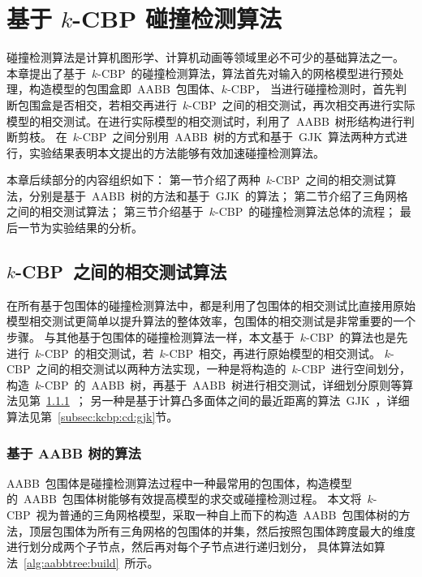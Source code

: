 

\chapter{基于 $k$-CBP 碰撞检测算法}
\label{cha:kcbp-collision-detection}

碰撞检测算法是计算机图形学、计算机动画等领域里必不可少的基础算法之一。
本章提出了基于~$k$-CBP~的碰撞检测算法，算法首先对输入的网格模型进行预处理，构造模型的包围盒即~AABB~包围体、$k$-CBP，
当进行碰撞检测时，首先判断包围盒是否相交，若相交再进行~$k$-CBP~之间的相交测试，再次相交再进行实际模型的相交测试。在进行实际模型的相交测试时，利用了~AABB~树形结构进行判断剪枝。
在~$k$-CBP~之间分别用~AABB~树的方式和基于~GJK~算法两种方式进行，实验结果表明本文提出的方法能够有效加速碰撞检测算法。

本章后续部分的内容组织如下：
第一节介绍了两种~$k$-CBP~之间的相交测试算法，分别是基于~AABB~树的方法和基于~GJK~的算法；
第二节介绍了三角网格之间的相交测试算法；
第三节介绍基于~$k$-CBP~的碰撞检测算法总体的流程；
最后一节为实验结果的分析。

\section{$k$-CBP~之间的相交测试算法}
\label{sec:kcbp:cd}

在所有基于包围体的碰撞检测算法中，都是利用了包围体的相交测试比直接用原始模型相交测试更简单以提升算法的整体效率，包围体的相交测试是非常重要的一个步骤。
与其他基于包围体的碰撞检测算法一样，本文基于~$k$-CBP~的算法也是先进行~$k$-CBP~的相交测试，若~$k$-CBP~相交，再进行原始模型的相交测试。
$k$-CBP~之间的相交测试以两种方法实现，一种是将构造的~$k$-CBP~进行空间划分，构造~$k$-CBP~的~AABB~树，再基于~AABB~树进行相交测试，详细划分原则等算法见第~\ref{subsec:kcbp:cd:aabb}~；
另一种是基于计算凸多面体之间的最近距离的算法~GJK~，详细算法见第~\ref{subsec:kcbp:cd:gjk}节。

\subsection{基于 AABB 树的算法}
\label{subsec:kcbp:cd:aabb}

AABB~包围体是碰撞检测算法过程中一种最常用的包围体，构造模型的~AABB~包围体树能够有效提高模型的求交或碰撞检测过程。
本文将~$k$-CBP~视为普通的三角网格模型，采取一种自上而下的构造~AABB~包围体树的方法，顶层包围体为所有三角网格的包围体的并集，然后按照包围体跨度最大的维度进行划分成两个子节点，然后再对每个子节点进行递归划分，
具体算法如算法~\ref{alg:aabbtree:build}~所示。

